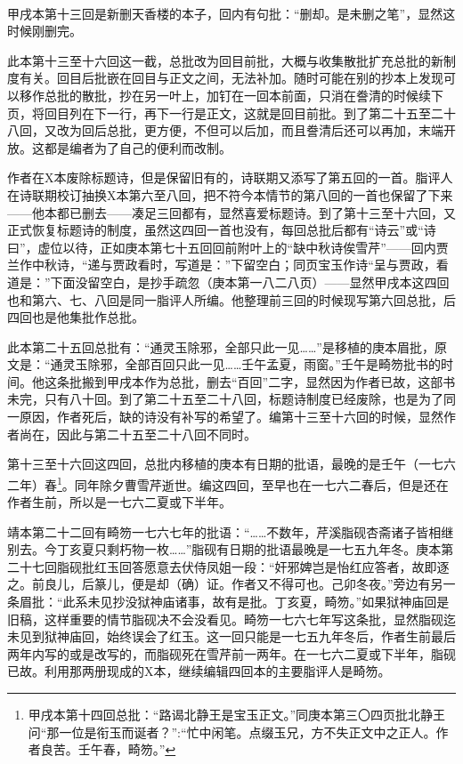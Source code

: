 \par  
\par 甲戌本第十三回是新删天香楼的本子，回内有句批：“删却。是未删之笔”，显然这时候刚删完。
\par 此本第十三至十六回这一截，总批改为回目前批，大概与收集散批扩充总批的新制度有关。回目后批嵌在回目与正文之间，无法补加。随时可能在别的抄本上发现可以移作总批的散批，抄在另一叶上，加钉在一回本前面，只消在誊清的时候续下页，将回目列在下一行，再下一行是正文，这就是回目前批。到了第二十五至二十八回，又改为回后总批，更方便，不但可以后加，而且誊清后还可以再加，末端开放。这都是编者为了自己的便利而改制。
\par 作者在X本废除标题诗，但是保留旧有的，诗联期又添写了第五回的一首。脂评人在诗联期校订抽换X本第六至八回，把不符今本情节的第八回的一首也保留了下来——他本都已删去——凑足三回都有，显然喜爱标题诗。到了第十三至十六回，又正式恢复标题诗的制度，虽然这四回一首也没有，每回总批后都有“诗云”或“诗曰”，虚位以待，正如庚本第七十五回回前附叶上的“缺中秋诗俟雪芹”——回内贾兰作中秋诗，“递与贾政看时，写道是：”下留空白；同页宝玉作诗“呈与贾政，看道是：”下面没留空白，是抄手疏忽（庚本第一八二八页）——显然甲戌本这四回也和第六、七、八回是同一脂评人所编。他整理前三回的时候现写第六回总批，后四回也是他集批作总批。
\par 此本第二十五回总批有：“通灵玉除邪，全部只此一见……”是移植的庚本眉批，原文是：“通灵玉除邪，全部百回只此一见……壬午孟夏，雨窗。”壬午是畸笏批书的时间。他这条批搬到甲戌本作为总批，删去“百回”二字，显然因为作者已故，这部书未完，只有八十回。到了第二十五至二十八回，标题诗制度已经废除，也是为了同一原因，作者死后，缺的诗没有补写的希望了。编第十三至十六回的时候，显然作者尚在，因此与第二十五至二十八回不同时。
\par 第十三至十六回这四回，总批内移植的庚本有日期的批语，最晚的是壬午（一七六二年）春\footnote{甲戌本第十四回总批：“路谒北静王是宝玉正文。”同庚本第三〇四页批北静王问“那一位是衔玉而诞者？”:“忙中闲笔。点缀玉兄，方不失正文中之正人。作者良苦。壬午春，畸笏。”}。同年除夕曹雪芹逝世。编这四回，至早也在一七六二春后，但是还在作者生前，所以是一七六二夏或下半年。
\par 靖本第二十二回有畸笏一七六七年的批语：“……不数年，芹溪脂砚杏斋诸子皆相继别去。今丁亥夏只剩朽物一枚……”脂砚有日期的批语最晚是一七五九年冬。庚本第二十七回脂砚批红玉回答愿意去伏侍凤姐一段：“奸邪婢岂是怡红应答者，故即逐之。前良儿，后篆儿，便是却（确）证。作者又不得可也。己卯冬夜。”旁边有另一条眉批：“此系未见抄没狱神庙诸事，故有是批。丁亥夏，畸笏。”如果狱神庙回是旧稿，这样重要的情节脂砚决不会没看见。畸笏一七六七年写这条批，显然脂砚迄未见到狱神庙回，始终误会了红玉。这一回只能是一七五九年冬后，作者生前最后两年内写的或是改写的，而脂砚死在雪芹前一两年。在一七六二夏或下半年，脂砚已故。利用那两册现成的X本，继续编辑四回本的主要脂评人是畸笏。
